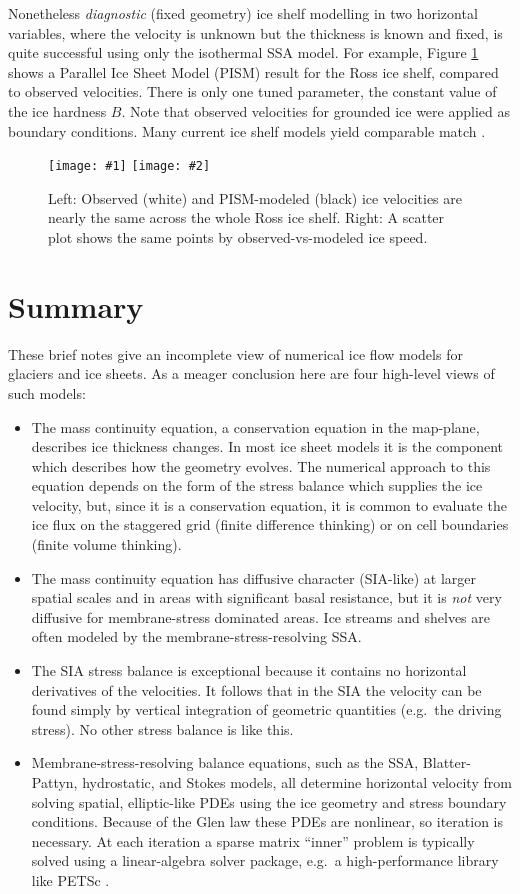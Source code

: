 \documentclass[letterpaper,final,12pt,reqno]{amsart}
\newcommand{\twofigsizes}[5]{
\begin{figure}[ht]
\centering
\texttt{[image: \#1]} \quad
\texttt{[image: \#2]}
\caption{#3}
\label{fig:#1}
\end{figure}}
\begin{document}
Nonetheless \emph{diagnostic} (fixed geometry) ice shelf modelling in two horizontal variables, where the velocity is unknown but the thickness is known and fixed, is quite successful using only the isothermal SSA model.  For example, Figure \ref{fig:rossquiver} shows a Parallel Ice Sheet Model (PISM) \cite{BBssasliding,Winkelmannetal2011} result for the Ross ice shelf, compared to observed velocities.  There is only one tuned parameter, the constant value of the ice hardness $B$.  Note that observed velocities for grounded ice were applied as boundary conditions.  Many current ice shelf models yield comparable match \cite{MacAyealetal}.

\twofigsizes{rossquiver}{rossscatter}{Left: Observed (white) and PISM-modeled (black) ice velocities are nearly the same across the whole Ross ice shelf.  Right: A scatter plot shows the same points by observed-vs-modeled ice speed.}{2.85in}{3.0in}


\section{Summary} \label{sec:summary}

These brief notes give an incomplete view of numerical ice flow models for glaciers and ice sheets.  As a meager conclusion here are four high-level views of such models:
\begin{itemize}
\item The mass continuity equation, a conservation equation in the map-plane, describes ice thickness changes.  In most ice sheet models it is the component which describes how the geometry evolves.  The numerical approach to this equation depends on the form of the stress balance which supplies the ice velocity, but, since it is a conservation equation, it is common to evaluate the ice flux on the staggered grid (finite difference thinking) or on cell boundaries (finite volume thinking).
\item The mass continuity equation has diffusive character (SIA-like) at larger spatial scales and in areas with significant basal resistance, but it is \emph{not} very diffusive for membrane-stress dominated areas.  Ice streams and shelves are often modeled by the membrane-stress-resolving SSA.
\item The SIA stress balance is exceptional because it contains no horizontal derivatives of the velocities.  It follows that in the SIA the velocity can be found simply by vertical integration of geometric quantities (e.g.~the driving stress).  No other stress balance is like this.
\item Membrane-stress-resolving balance equations, such as the SSA, Blatter-Pattyn, hydrostatic, and Stokes models, all determine horizontal velocity from solving spatial, elliptic-like PDEs using the ice geometry and stress boundary conditions.  Because of the Glen law these PDEs are nonlinear, so iteration is necessary.  At each iteration a sparse matrix ``inner'' problem is typically solved using a linear-algebra solver package, e.g.~a high-performance library like PETSc \cite{Bueler2021}.
\end{itemize}
\end{document}
